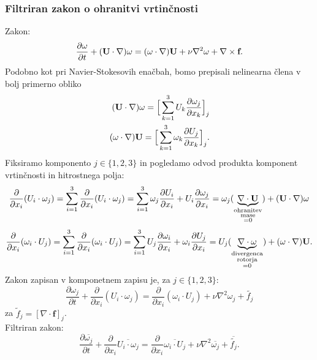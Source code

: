 \documentclass[mat2, tisk]{fmfdelo}
\newcommand{\bd}{\textbf}
\begin{document}
\subsubsection{Filtriran zakon o ohranitvi vrtinčnosti}

Zakon:
$$
\frac{\partial \text{\bd{$\omega$}}}{\partial t} + (\bd{U}\cdot \nabla)\text{\bd{$\omega$}} = (\text{\bd{$\omega$}} \cdot \nabla)\bd{U} + \nu \nabla^2 \text{\bd{$\omega$}} + \nabla \times \bd{f}. 
$$
Podobno kot pri Navier-Stokesovih enačbah, bomo prepisali nelinearna člena v bolj primerno 
obliko
\begin{align*}
(\bd{U} \cdot \nabla) \text{\bd{$\omega$}} = \Big[\sum_{k=1}^3 U_k \frac{\partial \omega_j}{\partial x_k}\Big]_j\\
(\text{\bd{$\omega$}} \cdot \nabla) \bd{U} = \Big[\sum_{k=1}^3 \omega_k \frac{\partial U_j}{\partial x_k}\Big]_j.
\end{align*}
Fiksiramo komponento $j\in\{1, 2, 3\}$ in pogledamo odvod produkta komponent vrtinčnosti in hitrostnega polja:
\begin{align*}
\frac{\partial}{\partial x_i} (U_i \cdot\omega_j) = \sum_{i=1}^3 \frac{\partial}{\partial x_i} (U_i \cdot\omega_j) = 
\sum_{i=1}^3 \omega_j\frac{\partial U_i}{\partial x_i} + U_i\frac{\partial \omega_j}{\partial x_i} = 
\omega_j (\underbrace{\nabla \cdot \bd{U}}_{\substack{\text{ohranitev}\\\text{mase}\\=0}}) + (\bd{U}\cdot\nabla)\text{\bd{$\omega$}}
\end{align*}
\begin{align*}
\frac{\partial}{\partial x_i} (\omega_i \cdot U_j) = \sum_{i=1}^3 \frac{\partial}{\partial x_i} (\omega_i \cdot U_j) = 
\sum_{i=1}^3 U_j\frac{\partial \omega_i}{\partial x_i} + \omega_i\frac{\partial U_j}{\partial x_i} = 
U_j (\underbrace{\nabla \cdot \text{\bd{$\omega$}}}_{\substack{\text{divergenca}\\\text{rotorja}\\=0}}) + (\text{\bd{$\omega$}}\cdot\nabla)\text{\bd{U}}.
\end{align*}
Zakon zapisan v komponetnem zapisu je, za $j\in \{1, 2, 3\}$:
\begin{equation}
\frac{\partial \omega_j}{\partial t} + \frac{\partial}{\partial x_i} (U_i \cdot \omega_j) = 
\frac{\partial}{\partial x_i} (\omega_i \cdot U_j) + \nu \nabla^2 \omega_j + \tilde{f_j}
\end{equation}
za $\tilde{f}_j = [\nabla \cdot \bd{f}]_j$.\\
Filtriran zakon:
\begin{equation}
  \frac{\partial \overline{\omega_j}}{\partial t} + \frac{\partial}{\partial x_i} \overline{U_i \cdot \omega_j} = 
  \frac{\partial}{\partial x_i} \overline{\omega_i \cdot U_j} + \nu \nabla^2 \overline{\omega_j} + \overline{\tilde{f_j}}.
\end{equation}
\end{document}
